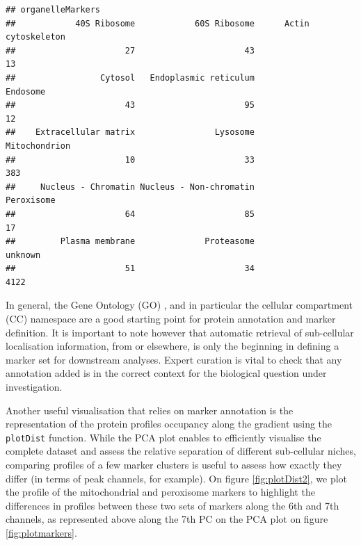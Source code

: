 \begin{knitrout}
\color{fgcolor}\begin{kframe}
\begin{alltt}
 \hlkwb{<-}   \hlstd{=} \hlstd{,}  \hlstd{=} \hlstd{)}
\end{alltt}
\begin{verbatim}
## organelleMarkers
##            40S Ribosome            60S Ribosome      Actin cytoskeleton 
##                      27                      43                      13 
##                 Cytosol   Endoplasmic reticulum                Endosome 
##                      43                      95                      12 
##    Extracellular matrix                Lysosome           Mitochondrion 
##                      10                      33                     383 
##     Nucleus - Chromatin Nucleus - Non-chromatin              Peroxisome 
##                      64                      85                      17 
##         Plasma membrane              Proteasome                 unknown 
##                      51                      34                    4122
\end{verbatim}
\end{kframe}
\end{knitrout}

In general, the Gene Ontology (GO) \cite{Ashburner:2000}, and in
particular the cellular compartment (CC) namespace are a good starting
point for protein annotation and marker definition. It is important to
note however that automatic retrieval of sub-cellular localisation
information, from  or elsewhere, is only the
beginning in defining a marker set for downstream analyses. Expert
curation is vital to check that any annotation added is in the correct
context for the biological question under investigation.

Another useful visualisation that relies on marker annotation is the
representation of the protein profiles occupancy along the gradient
using the \texttt{plotDist} function. While the PCA plot enables to
efficiently visualise the complete dataset and assess the relative
separation of different sub-cellular niches, comparing profiles of a
few marker clusters is useful to assess how exactly they differ (in
terms of peak channels, for example). On figure \ref{fig:plotDist2},
we plot the profile of the mitochondrial and peroxisome markers to
highlight the differences in profiles between these two sets of
markers along the 6th and 7th channels, as represented above along the
7th PC on the PCA plot on figure \ref{fig:plotmarkers}.

